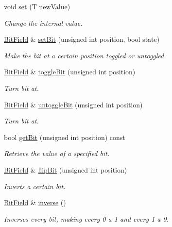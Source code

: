 \begin{DoxyCompactItemize}
void \hyperlink{structmc_1_1_bit_field_a8be3506d419dd9e5d7bae405ede836c3}{set} (T new\+Value)
\begin{DoxyCompactList}\small\item\em Change the internal value. \end{DoxyCompactList}\item 
\hyperlink{structmc_1_1_bit_field}{Bit\+Field} \& \hyperlink{structmc_1_1_bit_field_a4b93021726063ace31599f9e8a2df222}{set\+Bit} (unsigned int position, bool state)
\begin{DoxyCompactList}\small\item\em Make the bit at a certain position toggled or untoggled. \end{DoxyCompactList}\item 
\hyperlink{structmc_1_1_bit_field}{Bit\+Field} \& \hyperlink{structmc_1_1_bit_field_a715d75dd973a6fec9ed016b8a8d888db}{toggle\+Bit} (unsigned int position)
\begin{DoxyCompactList}\small\item\em Turn bit at. \end{DoxyCompactList}\item 
\hyperlink{structmc_1_1_bit_field}{Bit\+Field} \& \hyperlink{structmc_1_1_bit_field_a795cb413594e5d6e0210e4017a9242d5}{untoggle\+Bit} (unsigned int position)
\begin{DoxyCompactList}\small\item\em Turn bit at. \end{DoxyCompactList}\item 
bool \hyperlink{structmc_1_1_bit_field_a4c3809c2559bebab2a22f983b92d88f4}{get\+Bit} (unsigned int position) const 
\begin{DoxyCompactList}\small\item\em Retrieve the value of a specified bit. \end{DoxyCompactList}\item 
\hyperlink{structmc_1_1_bit_field}{Bit\+Field} \& \hyperlink{structmc_1_1_bit_field_a24b751df3cc0d33a5891141d2a53e985}{flip\+Bit} (unsigned int position)
\begin{DoxyCompactList}\small\item\em Inverts a certain bit. \end{DoxyCompactList}\item 
\hyperlink{structmc_1_1_bit_field}{Bit\+Field} \& \hyperlink{structmc_1_1_bit_field_a4630156bb00d06ca64a3107318d66d6f}{inverse} ()
\begin{DoxyCompactList}\small\item\em Inverses every bit, making every 0 a 1 and every 1 a 0. \end{DoxyCompactList}\item 

\end{DoxyCompactItemize}
